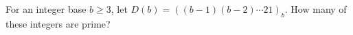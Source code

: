 For an integer base $b\ge3$, let $D(b)=((b-1)(b-2)\cdots21)_b$. How many of these integers are prime?
